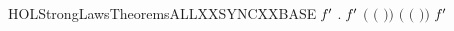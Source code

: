 \newcommand{\HOLStrongLawsDefinitionsSYNCXXdef}{\UseVerbatim{HOLStrongLawsDefinitionsSYNCXXdef}}
\newcommand{\HOLStrongLawsDefinitions}{
\HOLDfnTag{StrongLaws}{ALL_SYNC_def}\HOLStrongLawsDefinitionsALLXXSYNCXXdef
\HOLDfnTag{StrongLaws}{CCS_COMP_def}\HOLStrongLawsDefinitionsCCSXXCOMPXXdef
\HOLDfnTag{StrongLaws}{CCS_SIGMA_def}\HOLStrongLawsDefinitionsCCSXXSIGMAXXdef
\HOLDfnTag{StrongLaws}{Is_Prefix_def}\HOLStrongLawsDefinitionsIsXXPrefixXXdef
\HOLDfnTag{StrongLaws}{PREF_ACT_def}\HOLStrongLawsDefinitionsPREFXXACTXXdef
\HOLDfnTag{StrongLaws}{PREF_PROC_def}\HOLStrongLawsDefinitionsPREFXXPROCXXdef
\HOLDfnTag{StrongLaws}{SYNC_def}\HOLStrongLawsDefinitionsSYNCXXdef
}
\begin{SaveVerbatim}{HOLStrongLawsTheoremsALLXXSYNCXXBASE}
\HOLTokenTurnstile{} \HOLSymConst{\HOLTokenForall{}} \ensuremath{\HOLBoundVar{f}\sp{\prime{}}} .
        \ensuremath{\HOLBoundVar{f}\sp{\prime{}}}  \HOLSymConst{\ensuremath{=}}
      \ensuremath{(} \ensuremath{(} \ensuremath{)}\ensuremath{)} \ensuremath{(} \ensuremath{(} \ensuremath{)}\ensuremath{)} \ensuremath{\HOLBoundVar{f}\sp{\prime{}}} 
\end{SaveVerbatim}
\newcommand{\HOLStrongLawsTheoremsALLXXSYNCXXBASE}{\UseVerbatim{HOLStrongLawsTheoremsALLXXSYNCXXBASE}}
